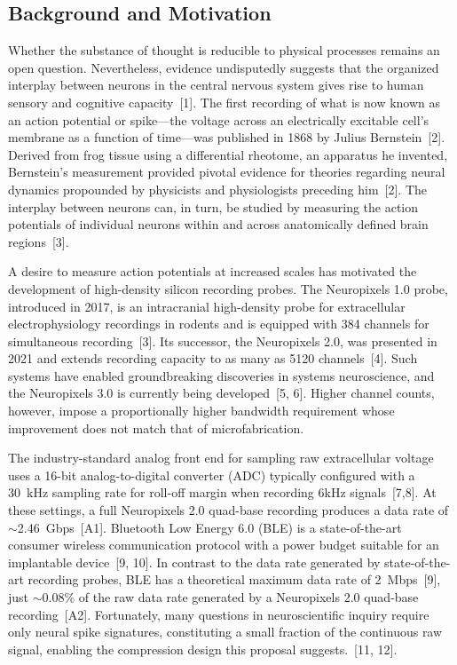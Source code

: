 \documentclass[11pt]{article}
\begin{document}
\subsection{Background and Motivation}
Whether the substance of thought is reducible to physical processes remains an open
question. Nevertheless, evidence undisputedly suggests that the organized interplay between
neurons in the central nervous system gives rise to human sensory and cognitive
capacity~[1]. The first recording of what is now known as an action potential or
spike---the voltage across an electrically excitable cell's membrane as a function of
time---was published in 1868 by Julius Bernstein~[2]. Derived from frog tissue using a
differential rheotome, an apparatus he invented, Bernstein's measurement provided pivotal
evidence for theories regarding neural dynamics propounded by physicists and physiologists
preceding him~[2]. The interplay between neurons can, in turn, be studied by measuring the
action potentials of individual neurons within and across anatomically defined brain
regions~[3].

A desire to measure action potentials at increased scales has motivated the development of
high-density silicon recording probes. The Neuropixels 1.0 probe, introduced in 2017, is an
intracranial high-density probe for extracellular electrophysiology recordings in rodents
and is equipped with 384 channels for simultaneous recording~[3]. Its successor, the Neuropixels
2.0, was presented in 2021 and extends recording capacity to as many as 5120
channels~[4]. Such systems have enabled groundbreaking discoveries in systems neuroscience,
and the Neuropixels 3.0 is currently being developed~[5, 6]. Higher channel counts,
however, impose a proportionally higher bandwidth requirement whose improvement does not match
that of microfabrication.

The industry-standard analog front end for sampling raw extracellular voltage uses a 16-bit
analog-to-digital converter (ADC) typically configured with a 30~kHz sampling rate for roll-off
margin when recording 6kHz signals~[7,8]. At these settings, a full Neuropixels 2.0 quad-base recording produces a data rate of
$\sim$2.46~Gbps~[A1]. Bluetooth Low Energy 6.0 (BLE) is a state-of-the-art consumer
wireless communication protocol with a power budget suitable for an implantable
device~[9, 10]. In contrast to the data rate generated by state-of-the-art recording
probes, BLE has a theoretical maximum data rate of 2~Mbps~[9], just $\sim$0.08\% of the raw
data rate generated by a Neuropixels 2.0 quad-base recording~[A2]. Fortunately, many
questions in neuroscientific inquiry require only neural spike signatures, constituting a
small fraction of the continuous raw signal, enabling the compression design this proposal
suggests.~[11, 12].
\end{document}
